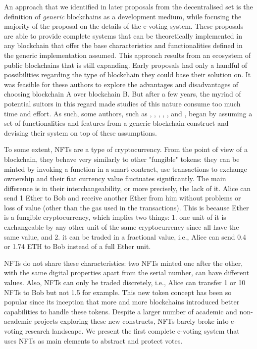         An approach that we identified in later proposals from the decentralised set is the definition of \textit{generic} blockchains as a development medium, while focusing the majority of the proposal on the details of the e-voting system. These proposals are able to provide complete systems that can be theoretically implemented in any blockchain that offer the base characteristics and functionalities defined in the generic implementation assumed. This approach results from an ecosystem of public blockchains that is still expanding. Early proposals had only a handful of possibilities regarding the type of blockchain they could base their solution on. It was feasible for these authors to explore the advantages and disadvantages of choosing blockchain A over blockchain B. But after a few years, the myriad of potential suitors in this regard made studies of this nature consume too much time and effort. As such, some authors, such as \cite{Adiputra2019}, \cite{Chaieb2019}, \cite{Yang2020}, \cite{Sadia2020}, \cite{Zaghloul2020}, and \cite{Zhang2020}, began by assuming a set of functionalities and features from a generic blockchain construct and devising their system on top of these assumptions.
        \par

        To some extent, NFTs are a type of cryptocurrency. From the point of view of a blockchain, they behave very similarly to other "fungible" tokens: they can be minted by invoking a function in a smart contract, use transactions to exchange ownership and their fiat currency value fluctuates significantly. The main difference is in their interchangeability, or more precisely, the lack of it. Alice can send 1 Ether to Bob and receive another Ether from him without problems or loss of value (other than the gas used in the transactions). This is because Ether is a fungible cryptocurrency, which implies two things: 1. one unit of it is exchangeable by any other unit of the same cryptocurrency since all have the same value, and 2. it can be traded in a fractional value, i.e., Alice can send 0.4 or 1.74 ETH to Bob instead of a full Ether unit.
    \par
    NFTs do not share these characteristics: two NFTs minted one after the other, with the same digital properties apart from the serial number, can have different values. Also, NFTs can only be traded discretely, i.e., Alice can transfer 1 or 10 NFTs to Bob but not 1.5 for example.
    This new token concept has been so popular since its inception that more and more blockchains introduced better capabilities to handle these tokens. Despite a larger number of academic and non-academic projects exploring these new constructs, NFTs barely broke into e-voting research landscape. We present the first complete e-voting system that uses NFTs as main elements to abstract and protect votes.